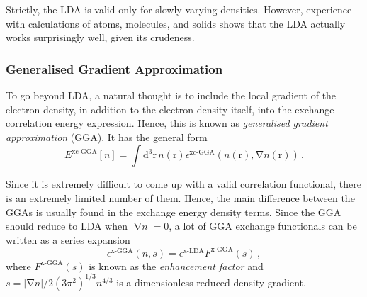 \documentclass{article}
\theoremstyle{plain}\theoremheaderfont{\normalfont\itshape}\theorembodyfont{\rmfamily}\theoremseparator{.}\newtheorem*{rem}{Remark}\newtheorem*{ex}{Example}\newtheorem*{proof}{Proof}\newtheorem*{altp}{Alternative proof}
\theoremstyle{plain}\theoremheaderfont{\normalfont\bfseries}\theorembodyfont{\rmfamily}\theoremseparator{.}\newtheorem{thm}{Theorem}[section]\newtheorem{lem}[thm]{Lemma}\newtheorem{prop}[thm]{Proposition}\newtheorem*{cor}{Corollary}\newtheorem{defn}[thm]{Definition}\newtheorem{clm}[thm]{Claim}\newtheorem{clminproof}{Claim}\newtheorem{pos}{Postulate}[section]
\theoremstyle{break}\theoremheaderfont{\normalfont\itshape}\theorembodyfont{\rmfamily}\theoremseparator{.\medskip}\newtheorem*{proofskip}{Proof}\newtheorem*{exs}{Examples}\newtheorem*{rems}{Remarks}
\theoremstyle{break}\theoremheaderfont{\normalfont\bfseries}\theorembodyfont{\rmfamily}\theoremseparator{.\medskip}\newtheorem{lemskip}[thm]{Lemma}\newtheorem{defnskip}[thm]{Definition}\newtheorem{propskip}[thm]{Proposition}\newtheorem{thmskip}[thm]{Theorem}
\numberwithin{equation}{section}
\newcommand{\dd}[2][]{\mathrm{d}^{#1} #2\,}
\newcommand{\vb}[1]{\bm{\mathrm{#1}}}
\newcommand{\abs}[1]{\left| #1 \right|}
\newcommand{\grad}{\vb{\nabla}}
\begin{document}
    Strictly, the LDA is valid only for slowly varying densities. However, experience with calculations of atoms, molecules, and solids shows that the LDA actually works surprisingly well, given its crudeness.

    \subsubsection{Generalised Gradient Approximation}
    To go beyond LDA, a natural thought is to include the local gradient of the electron density, in addition to the electron density itself, into the exchange correlation energy expression. Hence, this is known as \textit{generalised gradient approximation} (GGA). It has the general form
    \begin{equation}
        E^{\text{xc-GGA}}[n]=\int\dd[3]{\vb{r}}n(\vb{r})\epsilon^{\text{xc-GGA}}(n(\vb{r}),\grad n(\vb{r}))\,.
    \end{equation}

    Since it is extremely difficult to come up with a valid correlation functional, there is an extremely limited number of them. Hence, the main difference between the GGAs is usually found in the exchange energy density terms. Since the GGA should reduce to LDA when \(\abs{\grad n}=0\), a lot of GGA exchange functionals can be written as a series expansion
    \begin{equation}
        \epsilon^{\text{x-GGA}}(n,s)=\epsilon^{\text{x-LDA}}F^{\text{x-GGA}}(s)\,,
    \end{equation}
    where \(F^{\text{x-GGA}}(s)\) is known as the \textit{enhancement factor} and \(s=\abs{\grad n}/2(3\pi^2)^{1/3}n^{4/3}\) is a dimensionless reduced density gradient.
\end{document}
